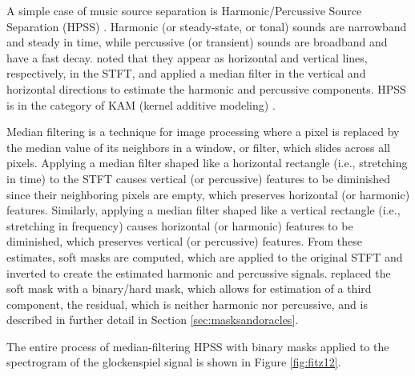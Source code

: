 \documentclass[report.tex]{subfiles}
\begin{document}
A simple case of music source separation is Harmonic/Percussive Source Separation (HPSS) \parencite{musicsepgood}. Harmonic (or steady-state, or tonal) sounds are narrowband and steady in time, while percussive (or transient) sounds are broadband and have a fast decay. \textcite{fitzgerald1} noted that they appear as horizontal and vertical lines, respectively, in the STFT, and applied a median filter in the vertical and horizontal directions to estimate the harmonic and percussive components. HPSS is in the category of KAM (kernel additive modeling) \parencite{musicsepgood}.

Median filtering is a technique for image processing where a pixel is replaced by the median value of its neighbors in a window, or filter, which slides across all pixels. Applying a median filter shaped like a horizontal rectangle (i.e., stretching in time) to the STFT causes vertical (or percussive) features to be diminished since their neighboring pixels are empty, which preserves horizontal (or harmonic) features. Similarly, applying a median filter shaped like a vertical rectangle (i.e., stretching in frequency) causes horizontal (or harmonic) features to be diminished, which preserves vertical (or percussive) features. From these estimates, soft masks are computed, which are applied to the original STFT and inverted to create the estimated harmonic and percussive signals. \textcite{driedger} replaced the soft mask with a binary/hard mask, which allows for estimation of a third component, the residual, which is neither harmonic nor percussive, and is described in further detail in Section \ref{sec:masksandoracles}.

The entire process of median-filtering HPSS with binary masks applied to the spectrogram of the glockenspiel signal is shown in Figure \ref{fig:fitz12}.
\end{document}
